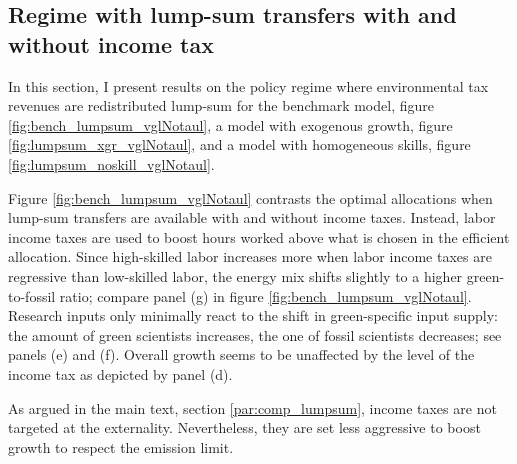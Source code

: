 \subsection{Regime with lump-sum transfers with and without income tax}\label{app:lumps}
In this section, I present results on the policy regime where environmental tax revenues are redistributed lump-sum for the benchmark model, figure \ref{fig:bench_lumpsum_vglNotaul}, a model with exogenous growth, figure \ref{fig:lumpsum_xgr_vglNotaul}, and a model with homogeneous skills, figure \ref{fig:lumpsum_noskill_vglNotaul}. 

 Figure \ref{fig:bench_lumpsum_vglNotaul} contrasts the optimal allocations when lump-sum transfers are available with and without income taxes. Instead, labor income taxes are used to boost hours worked above what is chosen in the efficient allocation. Since high-skilled labor increases more when labor income taxes are regressive than low-skilled labor, the energy mix shifts slightly to a higher green-to-fossil ratio; compare panel (g) in figure \ref{fig:bench_lumpsum_vglNotaul}. Research inputs only minimally react to the shift in green-specific input supply: the amount of green scientists increases, the one of fossil scientists decreases; see panels (e) and (f). Overall growth seems to be unaffected by the level of the income tax as depicted by panel (d). 

As argued in the main text, section \ref{par:comp_lumpsum}, income taxes are not targeted at the externality. Nevertheless, they are set less aggressive to boost growth to respect the emission limit. 

